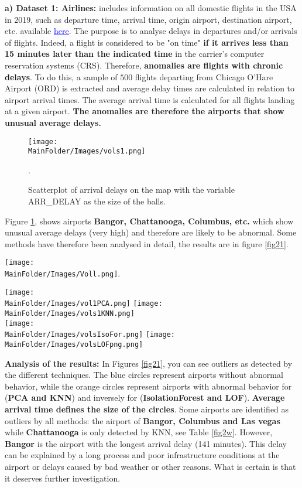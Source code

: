\noindent \textbf{a) Dataset 1: Airlines:} includes information on all domestic flights in the USA in 2019, such as departure time, arrival time, origin airport, destination airport, etc. available  \href{https://www.transtats.bts.gov/DL_SelectFields.asp?Table_ID=}{\textcolor{blue}{\underline{here}}}. The purpose is to analyse delays in departures and/or arrivals of flights. Indeed, a flight is considered to be "on time" \textbf{if it arrives less than 15 minutes later than the indicated time} in the carrier's computer reservation systems (CRS). Therefore, \textbf{anomalies are flights with chronic delays}. To do this, a sample of $500$ flights departing from Chicago O'Hare Airport (ORD) is extracted and average delay times are calculated in relation to airport arrival times. The average arrival time is calculated for all flights landing at a given airport.\textbf{ The anomalies are therefore the airports that show unusual average delays.}
\begin{figure}[H]
    \centering
    \texttt{[image: \\MainFolder/Images/vols1.png]}
    \caption{Scatterplot of arrival delays on the map with the variable ARR\_DELAY as the size of the balls.}%
    \label{fig20}.
\end{figure}
\noindent Figure \ref{fig20}, shows airports \textbf{Bangor, Chattanooga, Columbus, etc.} which show unusual average delays (very high) and therefore are likely to be abnormal. Some methods have therefore been analysed in detail, the results are in figure \ref{fig21}.\newl
\begin{figure*}[ht]
    \centering
     \texttt{[image: \\MainFolder/Images/Voll.png]}\label{fig02}.
    \caption{Airports detected as outliers by PCA, KNN, Isolation Forest and LOF.}%
    \texttt{[image: \\MainFolder/Images/vol1PCA.png]}
    \texttt{[image: \\MainFolder/Images/vols1KNN.png]}\\
    \texttt{[image: \\MainFolder/Images/volsIsoFor.png]}
    \texttt{[image: \\MainFolder/Images/volsLOFpng.png]}
    \caption{Airports detected as outliers by PCA (top left), KNN (top right), Isolation Forest (bottom left) and LOF (bottom right)}%
    \label{fig21}
\end{figure*}
\noindent\textbf{Analysis of the results:} 
In Figures \ref{fig21}, you can see outliers as detected by the different techniques. The blue circles represent airports without abnormal behavior, while the orange circles represent airports with abnormal behavior for (\textbf{PCA and KNN}) and inversely for (\textbf{IsolationForest and LOF}). \textbf{Average arrival time defines the size of the circles}. Some airports are identified as outliers by all methods: the airport of \textbf{Bangor, Columbus and Las vegas} while \textbf{Chattanooga} is only detected by KNN, see Table \ref{fig2w}. However, \textbf{Bangor} is the airport with the longest arrival delay (141 minutes). This delay can be explained by a long process and poor infrastructure conditions at the airport or delays caused by bad weather or other reasons. What is certain is that it deserves further investigation.


